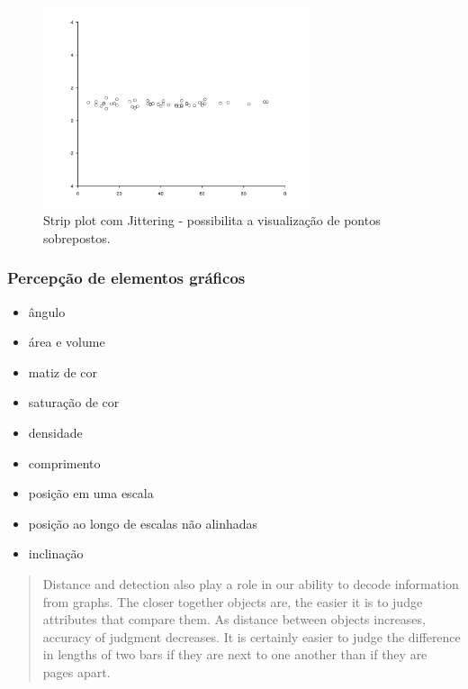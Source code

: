 \begin{frame}
\begin{figure}[h]
 \centering
  \includegraphics[width=0.7\textwidth,height=0.7\textheight,keepaspectratio]{figures/strip2.pdf}
 \caption{Strip plot com Jittering - possibilita a visualização de pontos sobrepostos.}
 \label{fig-strip2}
\end{figure}

\end{frame}





\begin{frame}[allowframebreaks]
\frametitle{Percepção de elementos gráficos}
\begin{itemize}
\item ângulo  
\item área e volume 
\item matiz de cor
\item saturação de cor
\item densidade
\item comprimento
\item posição em uma escala
\item posição ao longo de escalas não alinhadas
\item inclinação
\end{itemize}

\begin{quote}
Distance and detection also play a role in our ability to decode
information from graphs. The closer together objects are, the
easier it is to judge attributes that compare them. As distance
between objects increases, accuracy of judgment decreases. It
is certainly easier to judge the difference in lengths of two bars
if they are next to one another than if they are pages apart.
\cite{robbins_creating_2013}
\end{quote}

\end{frame}



